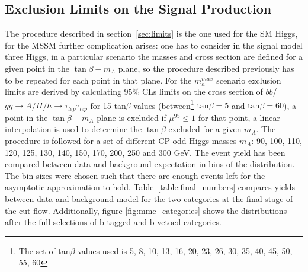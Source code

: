 \subsection{Exclusion Limits on the Signal Production}
The procedure described in section~\ref{sec:limits} is  the one used for the SM Higgs, for the MSSM further complication
arises: one has to consider in the signal 
model three Higgs, in a particular scenario the masses and cross section are defined for a given point in the $\tan \beta - m_A$
plane, so the procedure described previously has to be repeated for each point in that plane. 
For the $m_h^{max}$ scenario exclusion limits are derived by calculating $95\%$ CLs limits on the cross section of
$bb$/$gg\to A$/$H$/$h\to\tau_{lep}\tau_{lep}$ for 15 tan$\beta$ values (between\footnote{The set of  tan$\beta$ values used
is 5, 8, 10, 13, 16, 20, 23, 26, 30, 35, 40, 45, 50, 55, 60}  $\mathrm{tan}\beta=5$ and $\mathrm{tan}\beta=60$),
a point in the  $\tan \beta - m_A$ plane is excluded if $\mu^{95} \leq 1$ for that point, 
a linear interpolation is used to determine the $\tan \beta$ excluded for a given $m_A$.
The procedure is followed for a set of different CP-odd Higgs masses $m_A$: 90, 100, 110, 120, 125, 130,
140, 150, 170, 200, 250 and 300 GeV.
The event yield has been compared between data and background expectation in bins of the \mmc distribution. The bin sizes were chosen
such that there are enough events left for the asymptotic approximation  to  hold.
Table~\ref{table:final_numbers} compares yields between data and background model for the two categories at the final
stage of the cut flow. Additionally, figure \ref{fig:mmc_categories} shows the \mmc distributions after the full 
selections of b-tagged and b-vetoed categories. 


